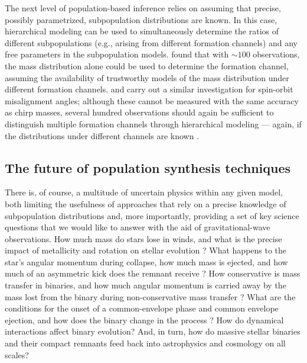 \documentclass[iop,onecolumn]{revtex4-1}
\begin{document}
The next level of population-based inference relies on assuming that precise, possibly parametrized, subpopulation distributions are known.  In this case, hierarchical modeling \citep[extreme deconvolution in the language of][]{Hogg:2010} can be used to simultaneously determine the ratios of different subpopulations (e.g., arising from different formation channels) and any free parameters in the subpopulation models.  \citet{Zevin:2017} found that with $\sim 100$ observations, the mass distribution alone could be used to determine the formation channel, assuming the availability of trustworthy models of the mass distribution under different formation channels.  \citet{Vitale:2015} and \citet{Stevenson:2017spin} carry out a similar investigation for spin-orbit misalignment angles; although these cannot be measured with the same accuracy as chirp masses, several hundred observations should again be sufficient to distinguish multiple formation channels through hierarchical modeling --- again, if the distributions under different channels are known \citep{Stevenson:2017spin}.  

\subsection{The future of population synthesis techniques}
There is, of course, a multitude of uncertain physics within any given model, both limiting the usefulness of approaches that rely on a precise knowledge of subpopulation distributions and, more importantly, providing a set of key science questions that we would like to answer with the aid of gravitational-wave observations.  How much mass do stars lose in winds, and what is the precise impact of metallicity and rotation on stellar evolution \citep[e.g.,][]{Renzo:2017}?  What happens to the star's angular momentum during collapse, how much mass is ejected, and how much of an asymmetric kick does the remnant receive \citep[e.g.,][]{Mirabel:2016}? How conservative is mass transfer in binaries, and how much angular momentum is carried away by the mass lost from the binary during non-conservative mass transfer \citep[e.g.,][]{vandenHeuvel:2017,Kruckow:2018}?  What are the conditions for the onset of a common-envelope phase and common envelope ejection, and how does the binary change in the process \citep[e.g.,][]{Ivanova:2013,Kruckow:2016}?   How do dynamical interactions affect binary evolution?  And, in turn, how do massive stellar binaries and their compact remnants feed back into astrophysics and cosmology on all scales?
\end{document}
